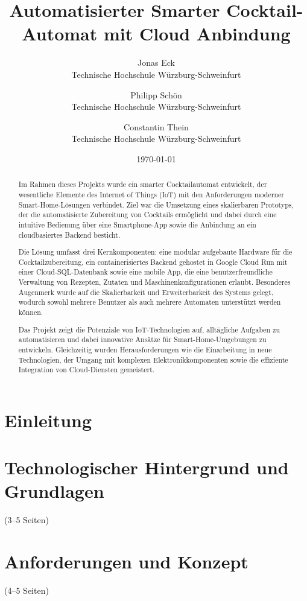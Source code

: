 \documentclass[a4paper, 12pt]{article} %
\title{Automatisierter Smarter Cocktail-Automat mit Cloud Anbindung}
\author{ 
  Jonas Eck \\
	Technische Hochschule Würzburg-Schweinfurt\\
	\and 
	Philipp Schön \\
	Technische Hochschule Würzburg-Schweinfurt\\
	\and 
  Constantin Thein\\
	Technische Hochschule Würzburg-Schweinfurt\\
	}
\date{\today}
\begin{document}
\maketitle
\newpage
\tableofcontents
\newpage

\begin{abstract}
Im Rahmen dieses Projekts wurde ein smarter Cocktailautomat entwickelt, der wesentliche Elemente des
Internet of Things (IoT) mit den Anforderungen moderner Smart-Home-Lösungen verbindet. Ziel war die
Umsetzung eines skalierbaren Prototyps, der die automatisierte Zubereitung von Cocktails ermöglicht 
und dabei durch eine intuitive Bedienung über eine Smartphone-App sowie die Anbindung an ein 
cloudbasiertes Backend besticht.

Die Lösung umfasst drei Kernkomponenten: eine modular aufgebaute Hardware für die 
Cocktailzubereitung, ein containerisiertes Backend gehostet in Google Cloud Run mit einer 
Cloud-SQL-Datenbank sowie eine mobile App, die eine benutzerfreundliche Verwaltung von Rezepten, 
Zutaten und Maschinenkonfigurationen erlaubt. Besonderes Augenmerk wurde auf die Skalierbarkeit und 
Erweiterbarkeit des Systems gelegt, wodurch sowohl mehrere Benutzer als auch mehrere Automaten 
unterstützt werden können.

Das Projekt zeigt die Potenziale von IoT-Technologien auf, alltägliche Aufgaben zu automatisieren 
und dabei innovative Ansätze für Smart-Home-Umgebungen zu entwickeln. Gleichzeitig wurden 
Herausforderungen wie die Einarbeitung in neue Technologien, der Umgang mit komplexen 
Elektronikkomponenten sowie die effiziente Integration von Cloud-Diensten gemeistert.
\end{abstract}
\newpage

\section{Einleitung}
    
\newpage

\section{Technologischer Hintergrund und Grundlagen}(3–5 Seiten)
    
\newpage

\section{Anforderungen und Konzept}(4–5 Seiten)
    
\newpage
\end{document}
